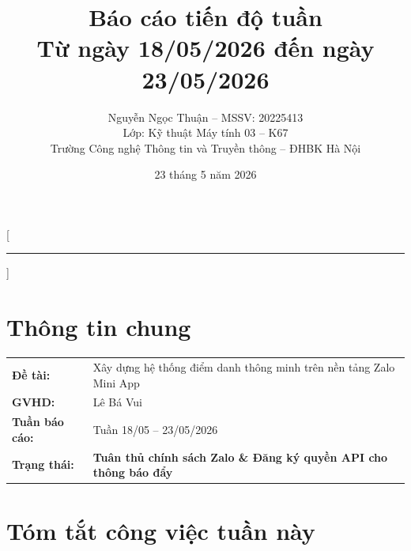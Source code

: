 \documentclass{article}
\title{Báo cáo tiến độ tuần\\[0.3em] \large Từ ngày 18/05/2026 đến ngày 23/05/2026}
\author{Nguyễn Ngọc Thuận -- MSSV: 20225413\\[0.2em] \normalsize Lớp: Kỹ thuật Máy tính 03 -- K67\\[0.1em] \normalsize Trường Công nghệ Thông tin và Truyền thông -- ĐHBK Hà Nội}
\date{23 tháng 5 năm 2026}
\begin{document}
\maketitle



\pagestyle{fancy}
\fancyhf{}
\fancyfoot[C]{\small\thepage}
\renewcommand{\headrulewidth}{0.4pt}

[\vspace{-0.3em}\textcolor{hustred}{\rule{\textwidth}{0.8pt}}]

\section{Thông tin chung}

\begin{tabularx}{\textwidth}{@{}l X@{}}
\textbf{Đề tài:} & Xây dựng hệ thống điểm danh thông minh trên nền tảng Zalo Mini App \\
\textbf{GVHD:} & Lê Bá Vui \\
\textbf{Tuần báo cáo:} & Tuần 18/05 -- 23/05/2026 \\
\textbf{Trạng thái:} & \textcolor{statusamber}{\textbf{Tuân thủ chính sách Zalo \& Đăng ký quyền API cho thông báo đẩy}} \\
\end{tabularx}

\section{Tóm tắt công việc tuần này}
\end{document}
